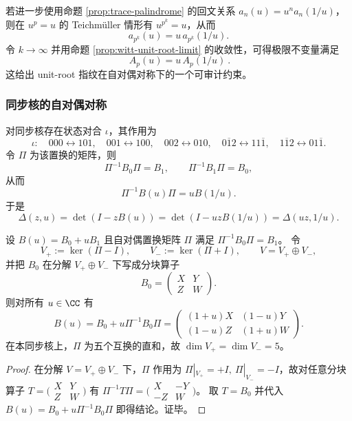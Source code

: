 \begin{remark}\label{rem:witt-unit-root-self-dual}
若进一步使用命题 \ref{prop:trace-palindrome} 的回文关系 \(a_n(u)=u^n a_n(1/u)\)，则在 \(u^p=u\) 的 Teichm\"uller 情形有 \(u^{p^k}=u\)，从而
\[
a_{p^k}(u)=u\,a_{p^k}(1/u).
\]
令 \(k\to\infty\) 并用命题 \ref{prop:witt-unit-root-limit} 的收敛性，可得极限不变量满足
\[
\boxed{\ A_p(u)=u\,A_p(1/u)\ }.
\]
这给出 unit-root 指纹在自对偶对称下的一个可审计约束。
\end{remark}

\subsubsection{同步核的自对偶对称}\label{app:kernel-self-dual}
对同步核存在状态对合 $\iota$，其作用为
\[
\iota:\quad
000\leftrightarrow 101,\quad
001\leftrightarrow 100,\quad
002\leftrightarrow 010,\quad
0\overline{1}2\leftrightarrow 11\overline{1},\quad
1\overline{1}2\leftrightarrow 01\overline{1}.
\]
令 $\Pi$ 为该置换的矩阵，则
\[
\Pi^{-1}B_0\Pi=B_1,\qquad \Pi^{-1}B_1\Pi=B_0,
\]
从而
\[
\Pi^{-1}B(u)\Pi=uB(1/u).
\]
于是
\[
\Delta(z,u)=\det(I-zB(u))=\det(I-uzB(1/u))=\Delta(uz,1/u).
\]

\begin{proposition}\label{prop:self-dual-normal-form-1pmu}
设 \(B(u)=B_0+uB_1\) 且自对偶置换矩阵 \(\Pi\) 满足 \(\Pi^{-1}B_0\Pi=B_1\)。
令
\[
V_+:=\ker(\Pi-I),\qquad V_-:=\ker(\Pi+I),
\qquad V=V_+\oplus V_-,
\]
并把 \(B_0\) 在分解 \(V_+\oplus V_-\) 下写成分块算子
\[
B_0=
\begin{pmatrix}
X & Y\\
Z & W
\end{pmatrix}.
\]
则对所有 \(u\in\CC\) 有
\[
\boxed{
B(u)=B_0+u\Pi^{-1}B_0\Pi
=
\begin{pmatrix}
(1+u)X & (1-u)Y\\
(1-u)Z & (1+u)W
\end{pmatrix}.
}
\]
在本同步核上，\(\Pi\) 为五个互换的直和，故 \(\dim V_+=\dim V_-=5\)。
\end{proposition}
\begin{proof}
在分解 \(V=V_+\oplus V_-\) 下，\(\Pi\) 作用为 \(\Pi|_{V_+}=+I,\ \Pi|_{V_-}=-I\)，故对任意分块算子 \(T=\bigl(\begin{smallmatrix}X&Y\\ Z&W\end{smallmatrix}\bigr)\) 有
\(
\Pi^{-1}T\Pi=\bigl(\begin{smallmatrix}X&-Y\\ -Z&W\end{smallmatrix}\bigr)
\)。
取 \(T=B_0\) 并代入 \(B(u)=B_0+u\Pi^{-1}B_0\Pi\) 即得结论。证毕。
\end{proof}

